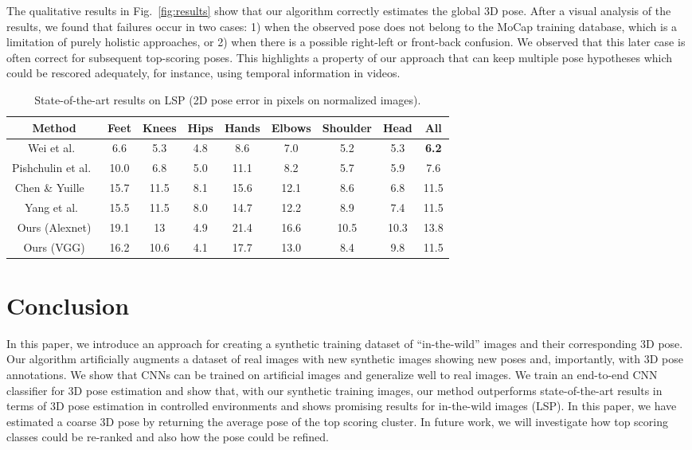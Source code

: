 \documentclass{article}
\begin{document}
The qualitative results in Fig.~\ref{fig:results} show that our algorithm correctly estimates the global 3D pose. After a visual analysis of the results, we found that failures occur in two cases:  1) when the observed pose does not belong to the MoCap training database, which is a limitation of purely holistic  approaches, or 2) when there is a possible right-left or front-back confusion. We observed that this later case is often correct for subsequent top-scoring poses.  This highlights a property of our approach that can keep multiple pose hypotheses which could be rescored adequately, for instance, using temporal information in videos. \begin{table} 
\caption{State-of-the-art results on LSP (2D pose error in pixels on normalized  images).}
\vspace{-2mm}\centering
\begin{tabular}{c|c|c|c|c|c|c|c|c}
Method   & Feet   & Knees & Hips & Hands  & Elbows & Shoulder & Head & All\\ 
\hline  

Wei et al.~\cite{WeiRKS16} &6.6 & 5.3& 4.8& 8.6 & 7.0& 5.2& 5.3& {\bf6.2}\\
Pishchulin et al.~\cite{PishchulinITAAG15} & 10.0 & 6.8 & 5.0 &  11.1 & 8.2 & 5.7 & 5.9 & 7.6\\   
Chen \& Yuille  ~\cite{ChenY14} &15.7 & 11.5& 8.1&  15.6 & 12.1& 8.6  & 6.8 & 11.5\\   
Yang et al.~\cite{yang2016end} &15.5 & 11.5& 8.0 &  14.7 & 12.2& 8.9 & 7.4& 11.5\\
   \hline
Ours (Alexnet) & 19.1 & 13 & 4.9 &  21.4 & 16.6& 10.5 & 10.3& 13.8  \\ 
Ours (VGG)  & 16.2 & 10.6 & 4.1 &  17.7 & 13.0& 8.4 &9.8& 11.5\\  
\end{tabular} 
\label{tab:LSPsota}
\end{table}


 
 
 \section{Conclusion}

 
In this paper, we introduce an approach for creating a synthetic training dataset of  ``in-the-wild'' images and their corresponding 3D pose.  
Our algorithm artificially augments a dataset of real images with new synthetic
images showing new poses and, importantly, with 3D pose annotations. 
We show that CNNs can be trained on artificial images and
  generalize well to real images. We train an end-to-end CNN classifier for 3D pose estimation and 
show that, with our synthetic training images, our method
outperforms state-of-the-art results in terms of 3D pose estimation in
controlled environments and shows promising results for in-the-wild images (LSP). 
In this paper, we have estimated a coarse 3D pose by returning the
average pose of the top scoring cluster. In future work, we will
investigate how top scoring classes could be re-ranked and also how
the pose could be refined. 
\end{document}
